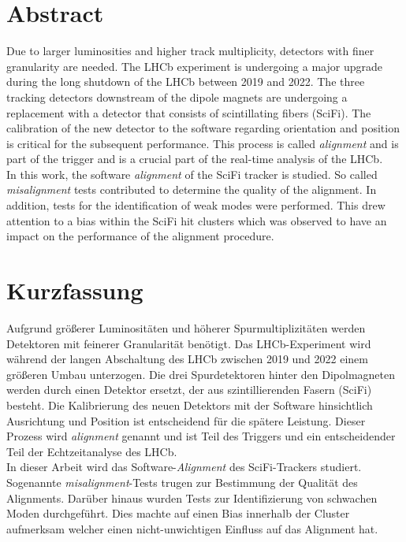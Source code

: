 \chapter*{Abstract}
\label{sec:abstract}

Due to larger luminosities and higher track multiplicity, detectors with finer granularity are needed.
The LHCb experiment is undergoing a major upgrade during the long shutdown of the LHCb between 2019 and 2022. The three tracking detectors downstream of the dipole magnets are undergoing a replacement with a detector that consists of scintillating fibers (SciFi).
The calibration of the new detector to the software regarding
orientation and position is critical for the subsequent performance. This
process is called \textit{alignment} and is part of the trigger and is a crucial part of the real-time analysis of the LHCb.
\\
In this work, the software \textit{alignment} of the SciFi tracker is studied.
So called \textit{misalignment} tests contributed to determine the quality
of the alignment. In addition, tests for the identification of weak modes were performed.
This drew attention to a bias within the SciFi hit clusters which was observed to have an impact on the performance of the alignment procedure.


\chapter*{Kurzfassung}
\label{sec:kurzf}

Aufgrund größerer Luminositäten und höherer Spurmultiplizitäten werden Detektoren mit feinerer Granularität benötigt.
Das LHCb-Experiment wird während der langen Abschaltung des LHCb zwischen 2019 und 2022 einem größeren Umbau unterzogen. Die drei Spurdetektoren hinter den Dipolmagneten werden durch einen Detektor ersetzt, der aus szintillierenden Fasern (SciFi) besteht.
Die Kalibrierung des neuen Detektors mit der Software hinsichtlich
Ausrichtung und Position ist entscheidend für die spätere Leistung. Dieser
Prozess wird \textit{alignment} genannt und ist Teil des Triggers und ein entscheidender Teil der Echtzeitanalyse des LHCb.
\\
In dieser Arbeit wird das Software-\textit{Alignment} des SciFi-Trackers studiert.
Sogenannte \textit{misalignment}-Tests trugen zur Bestimmung der Qualität
des Alignments. Darüber hinaus wurden Tests zur Identifizierung von schwachen Moden durchgeführt.
Dies machte auf einen Bias innerhalb der Cluster aufmerksam welcher einen
nicht-unwichtigen Einfluss auf das Alignment hat.
